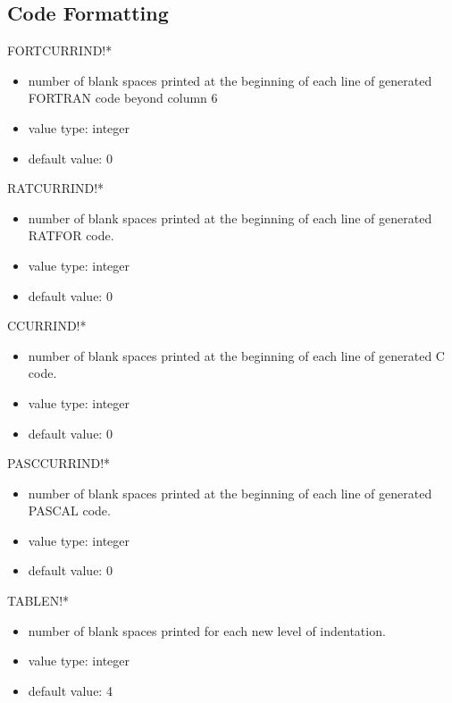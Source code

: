 \subsection{Code Formatting}
\begin{describe}{FORTCURRIND!*}
\begin{itemize}
\item number of blank spaces printed at the beginning of each line of
generated FORTRAN code beyond column 6
\item value type:  integer
\item default value:  0
\end{itemize}
\end{describe}
\begin{describe}{RATCURRIND!*}
\begin{itemize}
\item number of blank spaces printed at the beginning of each line of
generated RATFOR code.
\item value type:  integer
\item default value:  0
\end{itemize}
\end{describe}
\begin{describe}{CCURRIND!*}
\begin{itemize}
\item number of blank spaces printed at the beginning of each line of
generated C code.
\item value type:  integer
\item default value:  0
\end{itemize}
\end{describe}
\begin{describe}{PASCCURRIND!*}
\begin{itemize}
\item number of blank spaces printed at the beginning of each line of
generated PASCAL code.
\item value type:  integer
\item default value:  0
\end{itemize}
\end{describe}
\begin{describe}{TABLEN!*}
\begin{itemize}
\item number of blank spaces printed for each new level of indentation.
\item value type:  integer
\item default value:  4
\end{itemize}
\end{describe}
